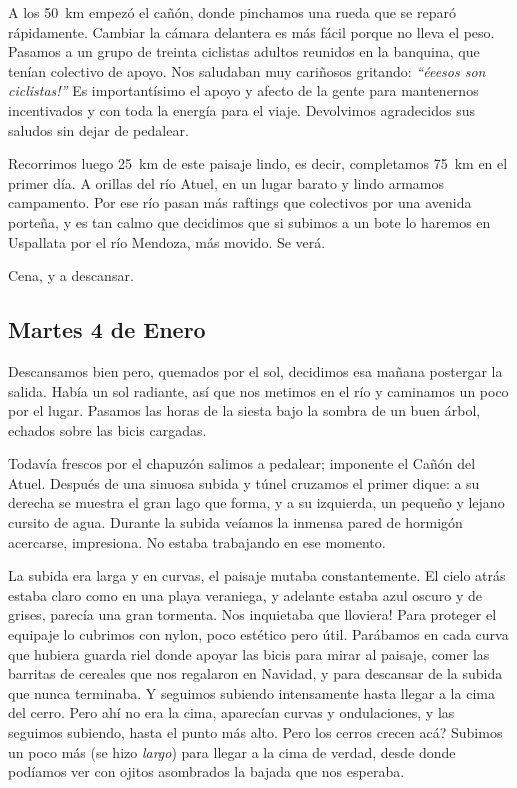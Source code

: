 A los 50~km empez\'o el ca\~n\'on, donde pinchamos una rueda que se repar\'o
r\'apidamente. Cambiar la c\'amara delantera es m\'as f\'acil porque no lleva el
peso. Pasamos a un grupo de treinta ciclistas adultos reunidos en la banquina,
que ten\'ian colectivo de apoyo. Nos saludaban muy cari\~nosos gritando:
\emph{``\textexclamdown \'eeesos son ciclistas!''} Es important\'isimo el apoyo
y afecto de la gente para mantenernos incentivados y con toda la energ\'ia para
el viaje. Devolvimos agradecidos sus saludos sin dejar de pedalear.

Recorrimos luego 25~km de este paisaje lindo, es decir, completamos 75~km en el
primer d\'ia. A orillas del r\'io Atuel, en un lugar barato y lindo armamos
campamento. Por ese r\'io pasan m\'as raftings que colectivos por una avenida
porte\~na, y es tan calmo que decidimos que si subimos a un bote lo haremos
en Uspallata por el r\'io Mendoza, m\'as movido. Se ver\'a.

Cena, y a descansar.

\subsection*{Martes 4 de Enero}

Descansamos bien pero, quemados por el sol, decidimos esa ma\~nana postergar la
salida. Hab\'ia un sol radiante, as\'i que nos metimos en el r\'io y caminamos
un poco por el lugar. Pasamos las horas de la siesta bajo la sombra de un buen
\'arbol, echados sobre las bicis cargadas.

Todav\'ia frescos por el chapuz\'on salimos a pedalear; imponente el Ca\~n\'on
del Atuel. Despu\'es de una sinuosa subida y t\'unel cruzamos el primer dique: a
su derecha se muestra el gran lago que forma, y a su izquierda, un peque\~no y
lejano cursito de agua. Durante la subida ve\'iamos la inmensa pared de
hormig\'on acercarse, impresiona. No estaba trabajando en ese momento.

La subida era larga y en curvas, el paisaje mutaba constantemente. El cielo
atr\'as estaba claro como en una playa veraniega, y adelante estaba azul oscuro
y de grises, parec\'ia una gran tormenta. \textexclamdown Nos inquietaba que
lloviera! Para proteger el equipaje lo cubrimos con nylon, poco est\'etico pero
\'util. Par\'abamos en cada curva que hubiera guarda riel donde apoyar las bicis
para mirar al paisaje, comer las barritas de cereales que nos regalaron en
Navidad, y para descansar de la subida que nunca terminaba. Y seguimos subiendo
intensamente hasta llegar a la cima del cerro. Pero ah\'i no era la cima,
aparec\'ian curvas y ondulaciones, y las seguimos subiendo, hasta el punto m\'as
alto. \textquestiondown Pero los cerros crecen ac\'a? Subimos un poco m\'as (se
hizo \emph{largo}) para llegar a la cima de verdad, desde donde pod\'iamos ver
con ojitos asombrados la bajada que nos esperaba.

